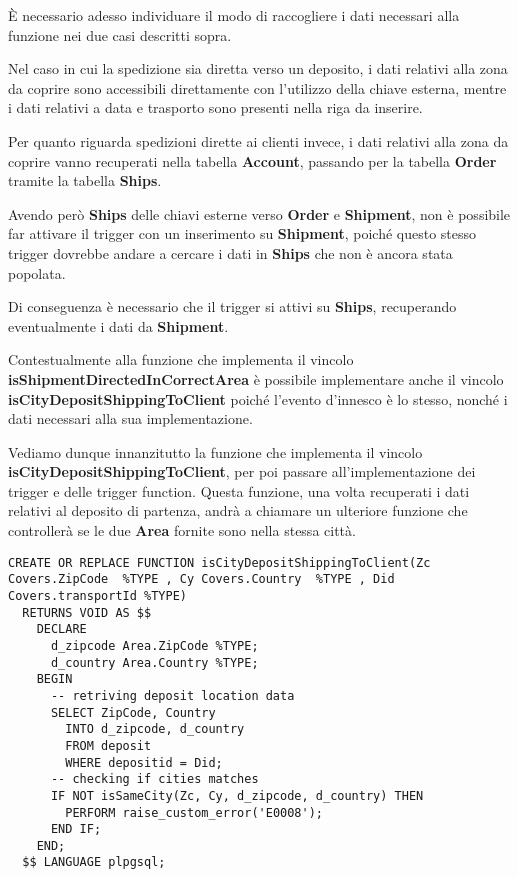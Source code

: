 È necessario adesso individuare il modo di raccogliere i dati necessari alla funzione nei due casi descritti sopra.

Nel caso in cui la spedizione sia diretta verso un deposito, i dati relativi alla zona da coprire sono accessibili direttamente con l'utilizzo della chiave esterna, mentre i dati relativi a data e trasporto sono presenti nella riga da inserire.

Per quanto riguarda spedizioni dirette ai clienti invece, i dati relativi alla zona da coprire vanno recuperati nella tabella \textbf{Account}, passando per la tabella \textbf{Order} tramite la tabella \textbf{Ships}.

Avendo però \textbf{Ships} delle chiavi esterne verso \textbf{Order} e \textbf{Shipment}, non è possibile far attivare il trigger con un inserimento su \textbf{Shipment}, poiché questo stesso trigger dovrebbe andare a cercare i dati in \textbf{Ships} che non è ancora stata popolata.

Di conseguenza è necessario che il trigger si attivi su \textbf{Ships}, recuperando eventualmente i dati da \textbf{Shipment}.

Contestualmente alla funzione che implementa il vincolo \textbf{isShipmentDirectedInCorrectArea} è possibile implementare anche il vincolo \textbf{isCityDepositShippingToClient}
poiché l'evento d'innesco è lo stesso, nonché i dati necessari alla sua implementazione.

Vediamo dunque innanzitutto la funzione che implementa il vincolo \textbf{isCityDepositShippingToClient}, per poi passare all'implementazione dei trigger e delle trigger function.
Questa funzione, una volta recuperati i dati relativi al deposito di partenza, andrà a chiamare un ulteriore funzione che controllerà se le due \textbf{Area} fornite sono nella stessa città.

\begin{lstlisting}[caption={Funzione per il vincolo \textbf{isCityDepositShippingToClient}}]
  CREATE OR REPLACE FUNCTION isCityDepositShippingToClient(Zc Covers.ZipCode  %TYPE , Cy Covers.Country  %TYPE , Did Covers.transportId %TYPE)
  RETURNS VOID AS $$
    DECLARE 
      d_zipcode Area.ZipCode %TYPE;
      d_country Area.Country %TYPE;
    BEGIN
      -- retriving deposit location data
      SELECT ZipCode, Country 
        INTO d_zipcode, d_country
        FROM deposit
        WHERE depositid = Did;
      -- checking if cities matches
      IF NOT isSameCity(Zc, Cy, d_zipcode, d_country) THEN
        PERFORM raise_custom_error('E0008');
      END IF;
    END;
  $$ LANGUAGE plpgsql;
\end{lstlisting}

